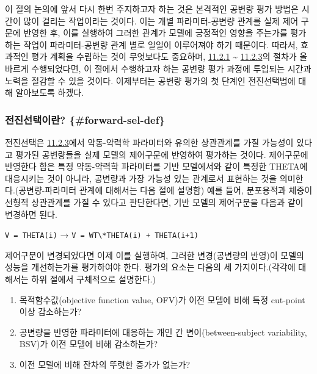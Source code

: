 \documentclass[
  10pt,
  krantz2,
  a4paper]{krantz}
\providecommand{\tightlist}{%
  \setlength{\itemsep}{0pt}\setlength{\parskip}{0pt}}
\theoremstyle{definition}
\theoremstyle{definition}
\theoremstyle{definition}
\theoremstyle{remark}
\begin{document}
이 절의 논의에 앞서 다시 한번 주지하고자 하는 것은 본격적인 공변량 평가 방법은 시간이 많이 걸리는 작업이라는 것이다. 이는 개별 파라미터-공변량 관계를 실제 제어 구문에 반영한 후, 이를 실행하여 그러한 관계가 모델에 긍정적인 영향을 주는가를 평가하는 작업이 파라미터-공변량 관계 별로 일일이 이루어져야 하기 때문이다. 따라서, 효과적인 평가 계획을 수립하는 것이 무엇보다도 중요하며, \protect\hyperlink{variable-eval}{11.2.1} \textasciitilde{} \protect\hyperlink{colinearity}{11.2.3}의 절차가 올바르게 수행되었다면, 이 절에서 수행하고자 하는 공변량 평가 과정에 투입되는 시간과 노력을 절감할 수 있을 것이다. 이제부터는 공변량 평가의 첫 단계인 전진선택법에 대해 알아보도록 하겠다.

\hypertarget{uxc804uxc9c4uxc120uxd0dduxc774uxb780-forward-sel-def}{%
\subsubsection{\texorpdfstring{전진선택이란? \{\#forward-sel-def\}}{전진선택이란? \{\#forward-sel-def\}}}\label{uxc804uxc9c4uxc120uxd0dduxc774uxb780-forward-sel-def}}

전진선택은 \protect\hyperlink{colinearity}{11.2.3}에서 약동-약력학 파라미터와 유의한 상관관계를 가질 가능성이 있다고 평가된 공변량들을 실제 모델의 제어구문에 반영하여 평가하는 것이다. 제어구문에 반영한다 함은 특정 약동-약력학 파라미터를 기반 모델에서와 같이 특정한 THETA에 대응시키는 것이 아니라, 공변량과 가장 가능성 있는 관계로서 표현하는 것을 의미한다.(공변량-파라미터 관계에 대해서는 다음 절에 설명함) 예를 들어, 분포용적과 체중이 선형적 상관관계를 가질 수 있다고 판단한다면, 기반 모델의 제어구문을 다음과 같이 변경하면 된다.

\texttt{V\ =\ THETA(i)} → \texttt{V\ =\ WT\textbackslash{}*THETA(i)\ +\ THETA(i+1)}

제어구문이 변경되었다면 이제 이를 실행하여, 그러한 변경(공변량의 반영)이 모델의 성능을 개선하는가를 평가하여야 한다. 평가의 요소는 다음의 세 가지이다.(각각에 대해서는 하위 절에서 구체적으로 설명한다.)

\begin{enumerate}
\def\labelenumi{\arabic{enumi}.}
\tightlist
\item
  목적함수값(objective function value, OFV)가 이전 모델에 비해 특정 cut-point 이상 감소하는가?
\item
  공변량을 반영한 파라미터에 대응하는 개인 간 변이(between-subject variability, BSV)가 이전 모델에 비해 감소하는가?
\item
  이전 모델에 비해 잔차의 뚜렷한 증가가 없는가?
\end{enumerate}
\end{document}
